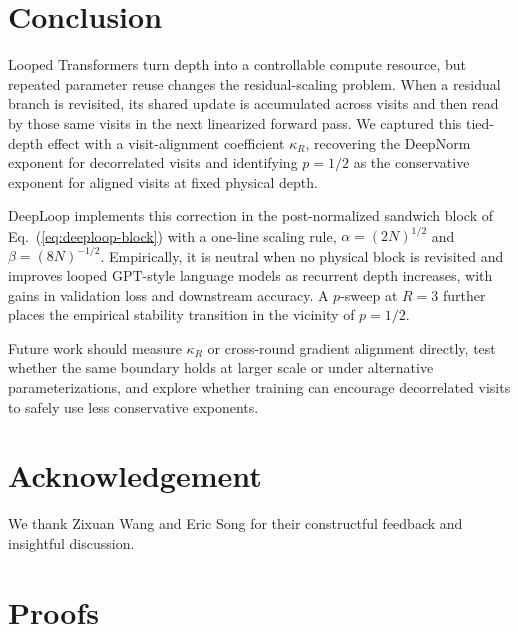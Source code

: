 \documentclass[11pt]{airesearch}
\begin{document}
\section{Conclusion}

Looped Transformers turn depth into a controllable compute resource, but repeated parameter reuse changes the residual-scaling problem. When a residual branch is revisited, its shared update is accumulated across visits and then read by those same visits in the next linearized forward pass. We captured this tied-depth effect with a visit-alignment coefficient $\kappa_R$, recovering the DeepNorm exponent for decorrelated visits and identifying $p=1/2$ as the conservative exponent for aligned visits at fixed physical depth.

DeepLoop implements this correction in the post-normalized sandwich block of
Eq.~(\ref{eq:deeploop-block}) with a one-line scaling rule,
$\alpha=(2N)^{1/2}$ and $\beta=(8N)^{-1/2}$. Empirically, it is neutral when no physical block is revisited and improves looped GPT-style language models as recurrent depth increases, with gains in validation loss and downstream accuracy. A $p$-sweep at $R{=}3$ further places the empirical stability transition in the vicinity of $p=1/2$.

Future work should measure $\kappa_R$ or cross-round gradient alignment directly, test whether the same boundary holds at larger scale or under alternative parameterizations, and explore whether training can encourage decorrelated visits to safely use less conservative exponents.

\section*{Acknowledgement}

We thank Zixuan Wang and Eric Song for their constructful feedback and insightful discussion.

\vspace{5ex}



\clearpage
\appendix

\renewcommand{\appendixpagename}{\centering \huge Appendix}
\appendixpage
{}

\startcontents[section]
\clearpage

\section{Proofs}
\label{app:proofs}
\end{document}
